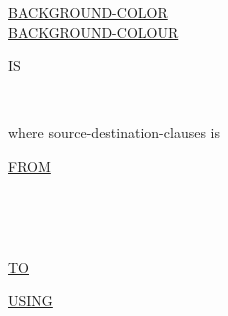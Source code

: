 \documentclass[a4paper,oneside,svgnames]{scrbook}
\makeatletter
\newcommand{\key}[1]{\underline{#1}}
\newcommand{\miscext}[1]{%
  \colorbox{blue!50}{#1}}
\newenvironment{0-1}{$\left[ \begin{tabular}{@{}l@{}}}{\end{tabular} \right]$}
\newenvironment{1=}{$\left\{ \begin{tabular}{@{}l@{}}}{\end{tabular} \right\}$}
\makeatother
\begin{document}
\begin{0-1}
  \begin{1=}
    \key{BACKGROUND-COLOR} \\
    \miscext{\key{BACKGROUND-COLOUR}}
  \end{1=}
  IS
  \begin{1=}
    \identifier \\
    \integer
  \end{1=}
\end{0-1}

where source-destination-clauses is

\begin{0-1}
  \key{FROM}
  \begin{1=}
    \identifier \\
    \literal
  \end{1=} \\
\end{0-1}

\begin{0-1}
  \key{TO} \identifier
\end{0-1}

\begin{0-1}
  \key{USING} \identifier
\end{0-1}
\end{document}
